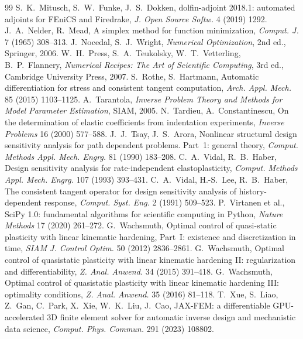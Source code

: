 \begin{chapterbib}{99}
 S.~K.~Mitusch, S.~W.~Funke, J.~S.~Dokken, dolfin-adjoint 2018.1: automated adjoints for FEniCS and Firedrake, \emph{J. Open Source Softw.} 4 (2019) 1292.
 J.~A.~Nelder, R.~Mead, A simplex method for function minimization, \emph{Comput. J.} 7 (1965) 308--313.
 J.~Nocedal, S.~J.~Wright, \emph{Numerical Optimization}, 2nd ed., Springer, 2006.
 W.~H.~Press, S.~A.~Teukolsky, W.~T.~Vetterling, B.~P.~Flannery, \emph{Numerical Recipes: The Art of Scientific Computing}, 3rd ed., Cambridge University Press, 2007.
 S.~Rothe, S.~Hartmann, Automatic differentiation for stress and consistent tangent computation, \emph{Arch. Appl. Mech.} 85 (2015) 1103--1125.
 A.~Tarantola, \emph{Inverse Problem Theory and Methods for Model Parameter Estimation}, SIAM, 2005.
 N.~Tardieu, A.~Constantinescu, On the determination of elastic coefficients from indentation experiments, \emph{Inverse Problems} 16 (2000) 577--588.
 J.~J.~Tsay, J.~S.~Arora, Nonlinear structural design sensitivity analysis for path dependent problems. Part~1: general theory, \emph{Comput. Methods Appl. Mech. Engrg.} 81 (1990) 183--208.
 C.~A.~Vidal, R.~B.~Haber, Design sensitivity analysis for rate-independent elastoplasticity, \emph{Comput. Methods Appl. Mech. Engrg.} 107 (1993) 393--431.
 C.~A.~Vidal, H.-S.~Lee, R.~B.~Haber, The consistent tangent operator for design sensitivity analysis of history-dependent response, \emph{Comput. Syst. Eng.} 2 (1991) 509--523.
 P.~Virtanen et al., SciPy 1.0: fundamental algorithms for scientific computing in Python, \emph{Nature Methods} 17 (2020) 261--272.
 G.~Wachsmuth, Optimal control of quasi-static plasticity with linear kinematic hardening, Part~I: existence and discretization in time, \emph{SIAM J. Control Optim.} 50 (2012) 2836--2861.
 G.~Wachsmuth, Optimal control of quasistatic plasticity with linear kinematic hardening II: regularization and differentiability, \emph{Z. Anal. Anwend.} 34 (2015) 391--418.
 G.~Wachsmuth, Optimal control of quasistatic plasticity with linear kinematic hardening III: optimality conditions, \emph{Z. Anal. Anwend.} 35 (2016) 81--118.
 T.~Xue, S.~Liao, Z.~Gan, C.~Park, X.~Xie, W.~K.~Liu, J.~Cao, JAX-FEM: a differentiable GPU-accelerated 3D finite element solver for automatic inverse design and mechanistic data science, \emph{Comput. Phys. Commun.} 291 (2023) 108802.
\end{chapterbib}
